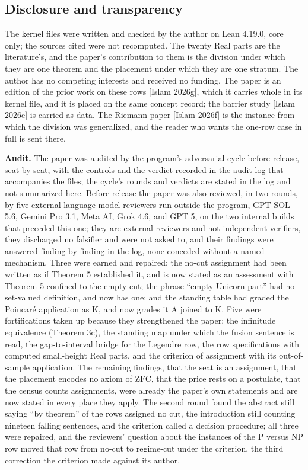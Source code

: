 \documentclass[10pt,twocolumn]{article}
\begin{document}
\hypertarget{disclosure-and-transparency}{%
\subsection{Disclosure and
transparency}\label{disclosure-and-transparency}}

The kernel files were written and checked by the author on Lean 4.19.0,
core only; the sources cited were not recomputed. The twenty Real parts
are the literature's, and the paper's contribution to them is the
division under which they are one theorem and the placement under which
they are one stratum. The author has no competing interests and received
no funding. The paper is an edition of the prior work on these rows
{[}Islam 2026g{]}, which it carries whole in its kernel file, and it is
placed on the same concept record; the barrier study {[}Islam 2026e{]}
is carried as data. The Riemann paper {[}Islam 2026f{]} is the instance
from which the division was generalized, and the reader who wants the
one-row case in full is sent there.

\textbf{Audit.} The paper was audited by the program's adversarial cycle
before release, seat by seat, with the controls and the verdict recorded
in the audit log that accompanies the files; the cycle's rounds and
verdicts are stated in the log and not summarized here. Before release
the paper was also reviewed, in two rounds, by five external
language-model reviewers run outside the program, GPT SOL 5.6, Gemini
Pro 3.1, Meta AI, Grok 4.6, and GPT 5, on the two internal builds that
preceded this one; they are external reviewers and not independent
verifiers, they discharged no falsifier and were not asked to, and their
findings were answered finding by finding in the log, none conceded
without a named mechanism. Three were earned and repaired: the no-cut
assignment had been written as if Theorem 5 established it, and is now
stated as an assessment with Theorem 5 confined to the empty cut; the
phrase ``empty Unicorn part'' had no set-valued definition, and now has
one; and the standing table had graded the Poincaré application as K,
and now grades it A joined to K. Five were fortifications taken up
because they strengthened the paper: the infinitude equivalence (Theorem
3c), the standing map under which the fusion sentence is read, the
gap-to-interval bridge for the Legendre row, the row specifications with
computed small-height Real parts, and the criterion of assignment with
its out-of-sample application. The remaining findings, that the seat is
an assignment, that the placement encodes no axiom of ZFC, that the
price rests on a postulate, that the census counts assignments, were
already the paper's own statements and are now stated in every place
they apply. The second round found the abstract still saying ``by
theorem'' of the rows assigned no cut, the introduction still counting
nineteen falling sentences, and the criterion called a decision
procedure; all three were repaired, and the reviewers' question about
the instances of the P versus NP row moved that row from no-cut to
regime-cut under the criterion, the third correction the criterion made
against its author.
\end{document}
